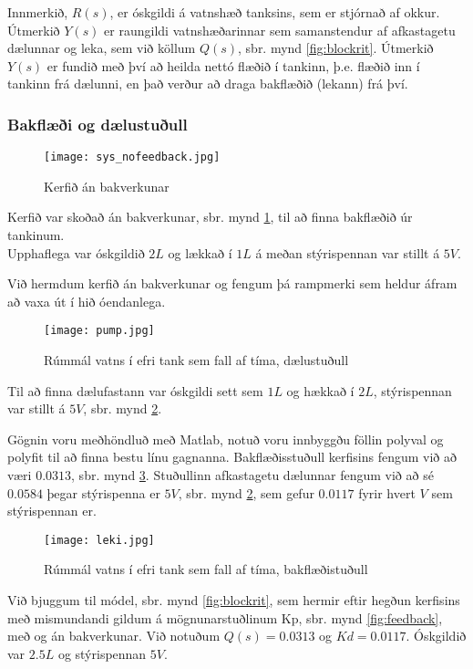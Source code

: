 \documentclass[12pt,final]{rureport}
\begin{document}
	Innmerkið, $R(s)$, er óskgildi á vatnshæð tanksins, sem er stjórnað af okkur. Útmerkið $Y(s)$ er raungildi vatnshæðarinnar sem samanstendur af afkastagetu dælunnar og leka, sem við köllum $Q(s)$, sbr. mynd \ref{fig:blockrit}. Útmerkið $Y(s)$ er fundið með því að heilda nettó flæðið í tankinn, þ.e. flæðið inn í tankinn frá dælunni, en það verður að draga bakflæðið (lekann) frá því.
	
	\subsubsection{Bakflæði og dælustuðull}
	\begin{figure}[h]
		\centering
		\texttt{[image: sys\_nofeedback.jpg]}
		\caption{Kerfið án bakverkunar}
		\label{fig:nofeedback}
	\end{figure}
	
	Kerfið var skoðað án bakverkunar, sbr. mynd \ref{fig:nofeedback}, til að finna bakflæðið úr tankinum.\\ Upphaflega var óskgildið $2L$ og lækkað í $1L$ á meðan stýrispennan var stillt á $5V$.
	
	Við hermdum kerfið án bakverkunar og fengum þá rampmerki sem heldur áfram að vaxa út í hið óendanlega.
	

	\begin{figure}[]
		\centering
		\texttt{[image: pump.jpg]}
		\caption{Rúmmál vatns í efri tank sem fall af tíma, dælustuðull}
		\label{fig:pump}
	\end{figure}
	
	Til að finna dælufastann var óskgildi sett sem $1L$ og hækkað í $2L$, stýrispennan var stillt á $5V$, sbr. mynd \ref{fig:pump}.
	
	Gögnin voru meðhöndluð með Matlab, notuð voru innbyggðu föllin polyval og polyfit til að finna bestu línu gagnanna. Bakflæðisstuðull kerfisins fengum við að væri $0.0313$, sbr. mynd \ref{fig:leki}. Stuðullinn afkastagetu dælunnar fengum við að sé $0.0584$ þegar stýrispenna er $5V$, sbr. mynd \ref{fig:pump}, sem gefur $0.0117$ fyrir hvert $V$ sem stýrispennan er.
	
	\begin{figure}[]
		\centering
		\texttt{[image: leki.jpg]}
		\caption{Rúmmál vatns í efri tank sem fall af tíma, bakflæðistuðull}
		\label{fig:leki}
	\end{figure}
	
	Við bjuggum til módel, sbr. mynd \ref{fig:blockrit}, sem hermir eftir hegðun kerfisins með mismundandi gildum á mögnunarstuðlinum Kp, sbr. mynd \ref{fig:feedback}, með og án bakverkunar. Við notuðum $Q(s) = 0.0313$ og $Kd = 0.0117$. Óskgildið var $2.5L$ og stýrispennan $5V$.
	
\end{document}
